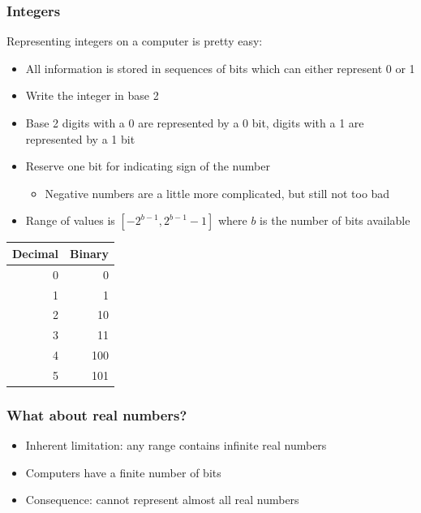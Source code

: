 \documentclass[aspectratio=169,hyperref={bookmarks=false,urlcolor=blue,colorlinks=true},10pt]{beamer}
\begin{document}
\begin{frame}
  \frametitle{Integers}

  Representing integers on a computer is pretty easy:
  \begin{itemize}
  \item All information is stored in sequences of bits which can either represent 0 or 1
  \item Write the integer in base 2
  \item Base 2 digits with a 0 are represented by a 0 bit, digits with a 1 are represented by a 1
    bit
  \item Reserve one bit for indicating sign of the number
    \begin{itemize}
    \item Negative numbers are a little more complicated, but still not too bad
    \end{itemize}
  \item Range of values is $[-2^{b-1},2^{b-1}-1]$ where $b$ is the number of bits available
  \end{itemize}

  \begin{table}
    \begin{tabular}{r|r}
      Decimal & Binary\\
      \hline
      0 & 0\\
      1 & 1\\
      2 & 10\\
      3 & 11\\
      4 & 100\\
      5 & 101
    \end{tabular}
  \end{table}
\end{frame}

\begin{frame}
  \frametitle{What about real numbers?}

  \begin{itemize}
  \item Inherent limitation: any range contains infinite real numbers
  \item Computers have a finite number of bits
  \item Consequence: cannot represent almost all real numbers
  \end{itemize}
\end{frame}
\end{document}
